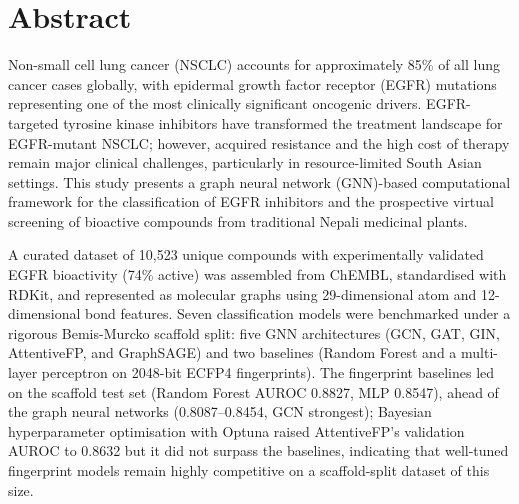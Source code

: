 
\chapter*{Abstract}
\thispagestyle{plain}
\vspace{0.3cm}

\begin{onehalfspace}
\noindent
Non-small cell lung cancer (NSCLC) accounts for approximately
85\% of all lung cancer cases globally, with epidermal growth
factor receptor (EGFR) mutations representing one of the most
clinically significant oncogenic drivers. EGFR-targeted tyrosine
kinase inhibitors have transformed the treatment landscape for
EGFR-mutant NSCLC; however, acquired resistance and the high cost
of therapy remain major clinical challenges, particularly in
resource-limited South Asian settings. This study presents a graph
neural network (GNN)-based computational framework for the
classification of EGFR inhibitors and the prospective virtual
screening of bioactive compounds from traditional Nepali medicinal
plants.

\vspace{0.3cm}
\noindent
A curated dataset of 10,523 unique compounds with experimentally
validated EGFR bioactivity (74\% active) was assembled from ChEMBL,
standardised with RDKit, and represented as molecular graphs using
29-dimensional atom and 12-dimensional bond features. Seven
classification models were benchmarked under a rigorous
Bemis-Murcko scaffold split: five GNN architectures (GCN, GAT, GIN,
AttentiveFP, and GraphSAGE) and two baselines (Random Forest and a
multi-layer perceptron on 2048-bit ECFP4 fingerprints). The
fingerprint baselines led on the scaffold test set (Random Forest
AUROC 0.8827, MLP 0.8547), ahead of the graph neural networks
(0.8087--0.8454, GCN strongest); Bayesian hyperparameter
optimisation with Optuna raised AttentiveFP's validation AUROC to
0.8632 but it did not surpass the baselines, indicating that
well-tuned fingerprint models remain highly competitive on a
scaffold-split dataset of this size.


\end{onehalfspace}
